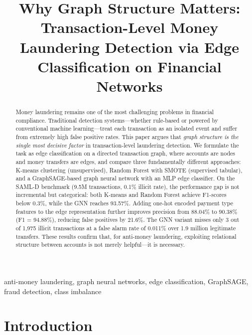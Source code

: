\documentclass[conference]{IEEEtran}
\begin{document}
\title{Why Graph Structure Matters: Transaction-Level Money Laundering Detection via Edge Classification on Financial Networks}

\author{
}

\maketitle

\begin{abstract}
Money laundering remains one of the most challenging problems in financial compliance.
Traditional detection systems—whether rule-based or powered by conventional machine learning—treat each transaction as an isolated event and suffer from extremely high false positive rates.
This paper argues that \textit{graph structure is the single most decisive factor} in transaction-level laundering detection.
We formulate the task as edge classification on a directed transaction graph, where accounts are nodes and money transfers are edges, and compare three fundamentally different approaches: K-means clustering (unsupervised), Random Forest with SMOTE (supervised tabular), and a GraphSAGE-based graph neural network with an MLP edge classifier.
On the SAML-D benchmark (9.5M transactions, 0.1\% illicit rate), the performance gap is not incremental but categorical: both K-means and Random Forest achieve F1-scores below 0.3\%, while the GNN reaches 93.57\%.
Adding one-hot encoded payment type features to the edge representation further improves precision from 88.04\% to 90.38\% (F1 = 94.88\%), reducing false positives by 21.6\%.
The GNN variant misses only 3 out of 1{,}975 illicit transactions at a false alarm rate of 0.011\% over 1.9 million legitimate transfers.
These results confirm that, for anti-money laundering, exploiting relational structure between accounts is not merely helpful—it is necessary.
\end{abstract}

\begin{IEEEkeywords}
anti-money laundering, graph neural networks, edge classification, GraphSAGE, fraud detection, class imbalance
\end{IEEEkeywords}

\section{Introduction}
\end{document}
